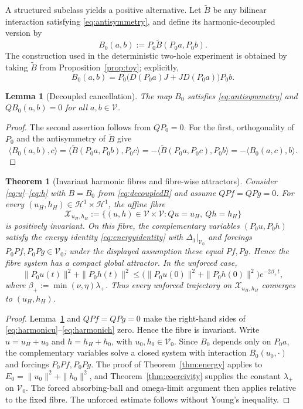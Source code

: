 \documentclass[11pt]{article}
\newtheorem{lemma}{Lemma}
\newtheorem{theorem}{Theorem}
\theoremstyle{remark}
\begin{document}
A structured subclass yields a positive alternative. Let $\widetilde B$ be any bilinear interaction satisfying \eqref{eq:antisymmetry}, and define its harmonic-decoupled version by
\begin{equation}
B_0(a,b):=P_0\widetilde B(P_0a,P_0b).
\label{eq:decoupledB}
\end{equation}
The construction used in the deterministic two-hole experiment is obtained by taking $\widetilde B$ from Proposition~\ref{prop:toy}; explicitly,
\[
B_0(a,b)=P_0\bigl(D(P_0a)J+JD(P_0a)\bigr)P_0b.
\]

\begin{lemma}[Decoupled cancellation]\label{lem:decoupled}
The map $B_0$ satisfies \eqref{eq:antisymmetry} and $QB_0(a,b)=0$ for all $a,b\in\mathcal V$.
\end{lemma}

\begin{proof}
The second assertion follows from $QP_0=0$. For the first, orthogonality of $P_0$ and the antisymmetry of $\widetilde B$ give
\[
\langle B_0(a,b),c\rangle
=\langle\widetilde B(P_0a,P_0b),P_0c\rangle
=-\langle\widetilde B(P_0a,P_0c),P_0b\rangle
=-\langle B_0(a,c),b\rangle.
\]
\end{proof}

\begin{theorem}[Invariant harmonic fibres and fibre-wise attractors]\label{thm:fibre}
Consider \eqref{eq:u}--\eqref{eq:h} with $B=B_0$ from \eqref{eq:decoupledB} and assume $QPf=QPg=0$. For every $(u_H,h_H)\in\mathcal H^1\times\mathcal H^1$, the affine fibre
\[
\mathcal X_{u_H,h_H}:=\{(u,h)\in\mathcal V\times\mathcal V:Qu=u_H,\ Qh=h_H\}
\]
is positively invariant. On this fibre, the complementary variables $(P_0u,P_0h)$ satisfy the energy identity \eqref{eq:energyidentity} with $\Delta_1|_{\mathcal V_0}$ and forcings $P_0Pf,P_0Pg\in\mathcal V_0$; under the displayed assumption these equal $Pf,Pg$. Hence the fibre system has a compact global attractor. In the unforced case,
\[
\|P_0u(t)\|^2+\|P_0h(t)\|^2
\leq
\bigl(\|P_0u(0)\|^2+\|P_0h(0)\|^2\bigr)e^{-2\beta_+t},
\]
where $\beta_+:=\min(\nu,\eta)\lambda_+$. Thus every unforced trajectory on $\mathcal X_{u_H,h_H}$ converges to $(u_H,h_H)$.
\end{theorem}

\begin{proof}
Lemma~\ref{lem:decoupled} and $QPf=QPg=0$ make the right-hand sides of \eqref{eq:harmonicu}--\eqref{eq:harmonich} zero. Hence the fibre is invariant. Write $u=u_H+u_0$ and $h=h_H+h_0$, with $u_0,h_0\in\mathcal V_0$. Since $B_0$ depends only on $P_0a$, the complementary variables solve a closed system with interaction $B_0(u_0,\cdot)$ and forcings $P_0Pf,P_0Pg$. The proof of Theorem~\ref{thm:energy} applies to $E_0=\|u_0\|^2+\|h_0\|^2$, and Theorem~\ref{thm:coercivity} supplies the constant $\lambda_+$ on $\mathcal V_0$. The forced absorbing-ball and omega-limit argument then applies relative to the fixed fibre. The unforced estimate follows without Young's inequality.
\end{proof}
\end{document}
